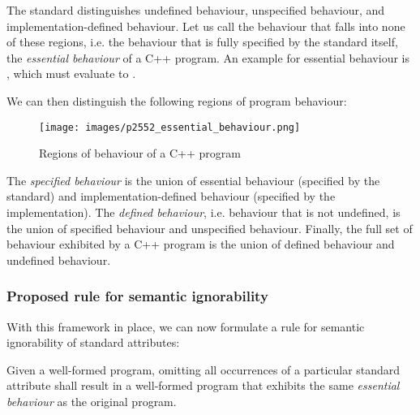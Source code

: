 The standard distinguishes undefined behaviour, unspecified behaviour, and implementation-defined behaviour. Let us call the behaviour that falls into none of these regions, i.e. the behaviour that is fully specified by the standard itself, the \emph{essential behaviour} of a C++ program. An example for essential behaviour is , which must evaluate to .

We can then distinguish the following regions of program behaviour:

\begin{figure}[!htbp]
  \texttt{[image: images/p2552\_essential\_behaviour.png]}
  \centering
  \caption{Regions of behaviour of a C++ program}
  \label{fig:behaviour}
\end{figure}

The \emph{specified behaviour} is the union of essential behaviour (specified by the standard) and implementation-defined behaviour (specified by the implementation). The \emph{defined behaviour}, i.e. behaviour that is not undefined, is the union of specified behaviour and unspecified behaviour. Finally, the full set of behaviour exhibited by a C++ program is the union of defined behaviour and undefined behaviour.

\subsubsection{Proposed rule for semantic ignorability}
\label{subsubsec:semanticrule}
With this framework in place, we can now formulate a rule for semantic ignorability of standard attributes:

\begin{adjustwidth}{0.5cm}{0.5cm}
Given a well-formed program, omitting all occurrences of a particular standard attribute shall result in a well-formed program that exhibits the same \emph{essential behaviour} as the original program.
\end{adjustwidth}

